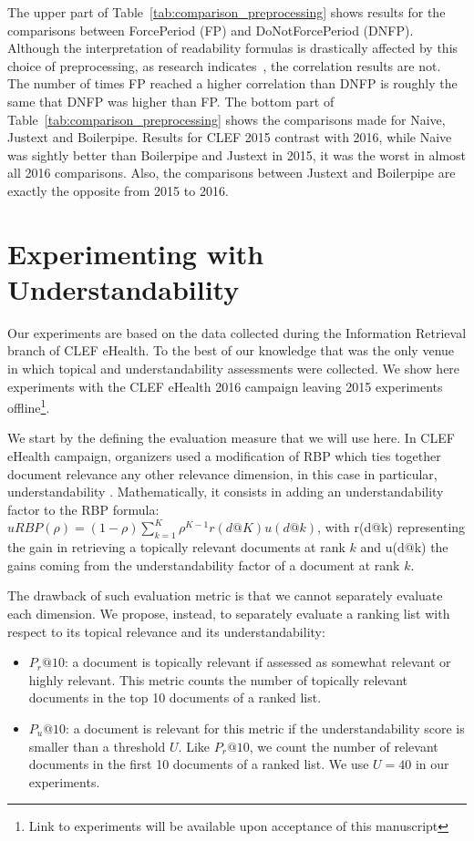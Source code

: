 The upper part of Table~\ref{tab:comparison_preprocessing} shows results for the comparisons between ForcePeriod (FP) and DoNotForcePeriod (DNFP). Although the interpretation of readability formulas is drastically affected by this choice of preprocessing, as research indicates~\cite{palotti15}, the correlation results are not.
The number of times FP reached a higher correlation than DNFP is roughly the same that DNFP was higher than FP.
The bottom part of Table~\ref{tab:comparison_preprocessing} shows the comparisons made for Naive, Justext and Boilerpipe. Results for CLEF 2015 contrast with 2016, while Naive was sightly better than Boilerpipe and Justext in 2015, it was the worst in almost all 2016 comparisons. Also, the comparisons between Justext and Boilerpipe are exactly the opposite from 2015 to 2016.

%

%

\section{Experimenting with Understandability}
\label{sec:experiments}

Our experiments are based on the data collected during the Information Retrieval branch of CLEF eHealth. To the best of our knowledge that was the only venue in which topical and understandability assessments were collected. 
We show here experiments with the CLEF eHealth 2016 campaign leaving 2015 experiments offline\footnote{Link to experiments will be available upon acceptance of this manuscript}.

We start by the defining the evaluation measure that we will use here. 
In CLEF eHealth campaign, organizers used a modification of RBP which ties together document relevance any other relevance dimension, in this case in particular, understandability \cite{clef16}.
Mathematically, it consists in adding an understandability factor to the RBP formula: $uRBP(\rho) = (1 - \rho) \sum_{k=1}^{K} \rho^{K-1} r(d@K) u(d@k)$, with r(d@k) representing the gain in retrieving a topically relevant documents at rank $k$ and u(d@k) the gains coming from the understandability factor of a document at rank $k$.

The drawback of such evaluation metric is that we cannot separately evaluate each dimension. We propose, instead, to separately evaluate a ranking list with respect to its topical relevance and its understandability:
\begin{itemize}
        \item $P_r@10$: a document is topically relevant if assessed as somewhat relevant or highly relevant. This metric counts the number of topically relevant documents in the top 10 documents of a ranked list.
        \item $P_u@10$: a document is relevant for this metric if the understandability score is smaller than a threshold $U$. Like $P_r@10$, we count the number of relevant documents in the first 10 documents of a ranked list. We use $U = 40$ in our experiments. 
\end{itemize}

